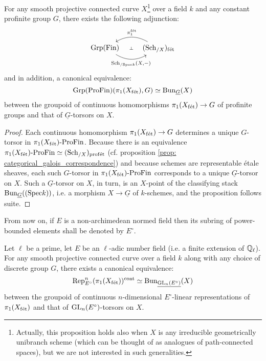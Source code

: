         \begin{proposition} \label{prop: etale_eckmann_hilton_duality}
            For any smooth projective connected curve $X$\footnote{Actually, this proposition holds also when $X$ is any irreducible geometrically unibranch scheme (which can be thought of as analogues of path-connected spaces), but we are not interested in such generalities.} over a field $k$ and any constant profinite group $G$, there exists the following adjunction:
                $$
                    \begin{tikzcd}
                    	{\Grp(\Fin)} & {(\Sch_{/X})_{\fet}}
                    	\arrow[""{name=0, anchor=center, inner sep=0}, "{\Sch_{/\Spec k}(X, -)}"', bend right, from=1-1, to=1-2]
                    	\arrow[""{name=1, anchor=center, inner sep=0}, "{\pi_1^{\fet}}"', bend right, from=1-2, to=1-1]
                    	\arrow["\dashv"{anchor=center, rotate=-90}, draw=none, from=1, to=0]
                    \end{tikzcd}
                $$
            and in addition, a canonical equivalence:
                $$\mathrm{Grp}(\mathrm{Pro}\mathrm{Fin})(\pi_1(X_{\mathrm{f\acute{e}t}}), G) \simeq \mathrm{Bun}_{\underline{G}}(X)$$
            between the groupoid of continuous homomorphisms $\pi_1(X_{\mathrm{f\acute{e}t}}) \to G$ of profinite groups and that of $\underline{G}$-torsors on $X$.
        \end{proposition}
            \begin{proof}
                Each continuous homomorphism $\pi_1(X_{\mathrm{f\acute{e}t}}) \to G$ determines a unique $G$-torsor in $\pi_1(X_{\mathrm{f\acute{e}t}})\text{-}\mathrm{Pro}\mathrm{Fin}$. Because there is an equivalence $\pi_1(X_{\mathrm{f\acute{e}t}})\text{-}\mathrm{Pro}\mathrm{Fin} \simeq (\mathrm{Sch}_{/X})_{\mathrm{prof\acute{e}t}}$ (cf. proposition \ref{prop: categorical_galois_correspondence}) and because schemes are representable \'etale sheaves, each such $G$-torsor in $\pi_1(X_{\mathrm{f\acute{e}t}})\text{-}\mathrm{Pro}\mathrm{Fin}$ corresponds to a unique $\underline{G}$-torsor on $X$. Such a $\underline{G}$-torsor on $X$, in turn, is an $X$-point of the classifying stack $\mathrm{Bun}_{\underline{G}}((\mathrm{Spec} k))$, i.e. a morphism $X \to \underline{G}$ of $k$-schemes, and the proposition follows suite.
            \end{proof}
        \begin{convention}
            From now on, if $E$ is a non-archimedean normed field then its subring of power-bounded elements shall be denoted by $E^{\circ}$. 
        \end{convention}
        \begin{corollary} \label{coro: continuous_representations_of_the_etale_fundamental_group_are_torsors}
            Let $\ell$ be a prime, let $E$ be an $\ell$-adic number field (i.e. a finite extension of $\mathbb{Q}_{\ell}$). For any smooth projective connected curve over a field $k$ along with any choice of discrete group $G$, there exists a canonical equivalence:
                $$\mathrm{Rep}^n_{E^{\circ}}(\pi_1(X_{\mathrm{f\acute{e}t}}))^{\mathrm{cont}} \simeq \mathrm{Bun}_{\underline{\operatorname{GL}_n(E^{\circ})}}(X)$$
            between the groupoid of continuous $n$-dimensional $E^{\circ}$-linear representations of $\pi_1(X_{\mathrm{f\acute{e}t}})$ and that of $\operatorname{GL}_n(E^{\circ})$-torsors on $X$.
        \end{corollary}
